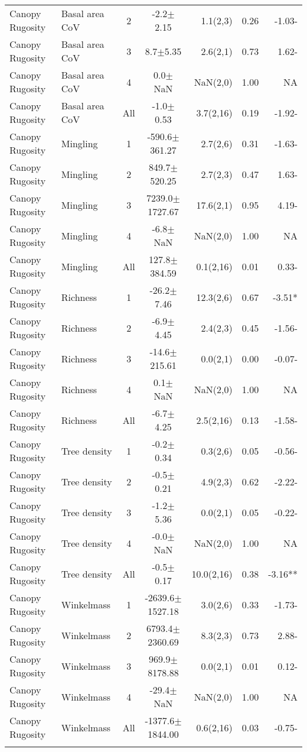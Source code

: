 \begin{longtable}{llcS[table-format=5.1(4.2)]rS[table-format=1.2]r}
  Canopy Rugosity & Basal area CoV & 2 & -2.2$\pm$2.15 & 1.1(2,3) & 0.26 & -1.03- \\ 
  Canopy Rugosity & Basal area CoV & 3 & 8.7$\pm$5.35 & 2.6(2,1) & 0.73 & 1.62- \\ 
  Canopy Rugosity & Basal area CoV & 4 & 0.0$\pm$NaN & NaN(2,0) & 1.00 & NA \\ 
  Canopy Rugosity & Basal area CoV & All & -1.0$\pm$0.53 & 3.7(2,16) & 0.19 & -1.92- \\ 
   \midrule
Canopy Rugosity & Mingling & 1 & -590.6$\pm$361.27 & 2.7(2,6) & 0.31 & -1.63- \\ 
  Canopy Rugosity & Mingling & 2 & 849.7$\pm$520.25 & 2.7(2,3) & 0.47 & 1.63- \\ 
  Canopy Rugosity & Mingling & 3 & 7239.0$\pm$1727.67 & 17.6(2,1) & 0.95 & 4.19- \\ 
  Canopy Rugosity & Mingling & 4 & -6.8$\pm$NaN & NaN(2,0) & 1.00 & NA \\ 
  Canopy Rugosity & Mingling & All & 127.8$\pm$384.59 & 0.1(2,16) & 0.01 & 0.33- \\ 
   \midrule
Canopy Rugosity & Richness & 1 & -26.2$\pm$7.46 & 12.3(2,6) & 0.67 & -3.51* \\ 
  Canopy Rugosity & Richness & 2 & -6.9$\pm$4.45 & 2.4(2,3) & 0.45 & -1.56- \\ 
  Canopy Rugosity & Richness & 3 & -14.6$\pm$215.61 & 0.0(2,1) & 0.00 & -0.07- \\ 
  Canopy Rugosity & Richness & 4 & 0.1$\pm$NaN & NaN(2,0) & 1.00 & NA \\ 
  Canopy Rugosity & Richness & All & -6.7$\pm$4.25 & 2.5(2,16) & 0.13 & -1.58- \\ 
   \midrule
Canopy Rugosity & Tree density & 1 & -0.2$\pm$0.34 & 0.3(2,6) & 0.05 & -0.56- \\ 
  Canopy Rugosity & Tree density & 2 & -0.5$\pm$0.21 & 4.9(2,3) & 0.62 & -2.22- \\ 
  Canopy Rugosity & Tree density & 3 & -1.2$\pm$5.36 & 0.0(2,1) & 0.05 & -0.22- \\ 
  Canopy Rugosity & Tree density & 4 & -0.0$\pm$NaN & NaN(2,0) & 1.00 & NA \\ 
  Canopy Rugosity & Tree density & All & -0.5$\pm$0.17 & 10.0(2,16) & 0.38 & -3.16** \\ 
   \midrule
Canopy Rugosity & Winkelmass & 1 & -2639.6$\pm$1527.18 & 3.0(2,6) & 0.33 & -1.73- \\ 
  Canopy Rugosity & Winkelmass & 2 & 6793.4$\pm$2360.69 & 8.3(2,3) & 0.73 & 2.88- \\ 
  Canopy Rugosity & Winkelmass & 3 & 969.9$\pm$8178.88 & 0.0(2,1) & 0.01 & 0.12- \\ 
  Canopy Rugosity & Winkelmass & 4 & -29.4$\pm$NaN & NaN(2,0) & 1.00 & NA \\ 
  Canopy Rugosity & Winkelmass & All & -1377.6$\pm$1844.00 & 0.6(2,16) & 0.03 & -0.75- \\ 
  \label{bivar_lm_summ}
\end{longtable}

